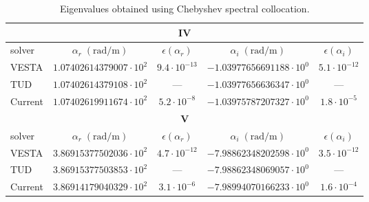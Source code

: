 \begin{table}[ht]
  \centering
  \caption{Eigenvalues obtained using Chebyshev spectral collocation.}
  \label{tab:eigs_iv_v}
  \setlength{\tabcolsep}{7pt}
  \begin{tabular}{@{}lcccc@{}}
    \toprule
    \multicolumn{5}{c}{\textbf{IV}}\\
    \midrule
    solver & $\alpha_r\;(\mathrm{rad/m})$ & $\epsilon(\alpha_r)$
           & $\alpha_i\;(\mathrm{rad/m})$ & $\epsilon(\alpha_i)$ \\
    \midrule
    VESTA   & $1.07402614379007\cdot 10^{2}$ & $9.4\cdot 10^{-13}$ &
               $-1.03977656691188\cdot 10^{0}$ & $5.1\cdot 10^{-12}$ \\
    TUD     & $1.07402614379108\cdot 10^{2}$ & --- &
               $-1.03977656636347\cdot 10^{0}$ & --- \\
    Current & $1.07402619911674\cdot 10^{2}$  & $5.2\cdot 10^{-8}$ &
               $-1.03975787207327\cdot 10^{0}$ & $1.8\cdot 10^{-5}$ \\
    \midrule
    \multicolumn{5}{c}{\textbf{V}}\\
    \midrule
    solver & $\alpha_r\;(\mathrm{rad/m})$ & $\epsilon(\alpha_r)$
           & $\alpha_i\;(\mathrm{rad/m})$ & $\epsilon(\alpha_i)$ \\
    \midrule
    VESTA   & $3.86915377502036\cdot 10^{2}$ & $4.7\cdot 10^{-12}$ &
               $-7.98862348202598\cdot 10^{0}$ & $3.5\cdot 10^{-12}$ \\
    TUD     & $3.86915377503853\cdot 10^{2}$ & --- &
               $-7.98862348069057\cdot 10^{0}$ & --- \\
    Current & $3.86914179040329\cdot 10^{2}$  & $3.1\cdot 10^{-6}$ &
               $-7.98994070166233\cdot 10^{0}$ & $1.6\cdot 10^{-4}$ \\
    \bottomrule
  \end{tabular}
\end{table}




 
